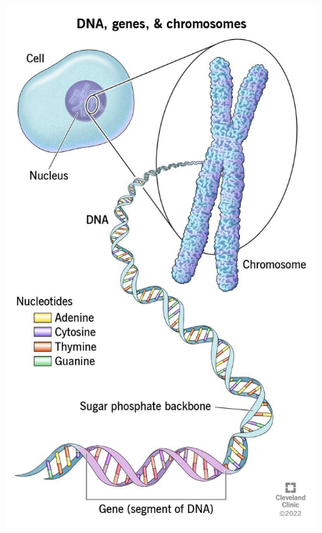 \documentclass{beamer}
\begin{document}
\begin{frame}
\begin{columns}
\begin{column}{0.5\textwidth}
		\end{column}
		\begin{column}{0.5\textwidth}
			\centering	\includegraphics[keepaspectratio, width  = 0.9\textwidth]{img/geneOnDNA}\\
		\end{column}
	\end{columns}
	
\end{frame}
\end{document}

